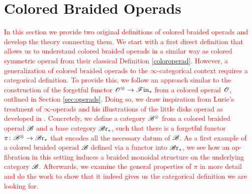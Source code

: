 \section{Colored Braided Operads}\label{sec:colbraidop}

\textcolor{red}{In this section we provide two original definitions of colored braided operads and develop the theory connecting them.
We start with a first direct definition that allows us to understand colored braided operads in a similar way as colored 
symmetric operad from their classical Definition \ref{coloroperad}.
However, a generalization of colored braided operads to the $\infty$-categorical context requires a categorical definition.
To provide this, we follow an approach similar to the construction of the forgetful functor $\mathscr{O}^{\otimes} \to \mathscr{F} \text{in}_{\ast}$ from a colored operad $\mathscr{O}$, outlined in Section \ref{sec:operads}.
Doing so, we draw inspiration from Lurie's treatment of $\infty$-operads and his illustrations of the little disks operad as developed in \cite[Section 2]{ha}.
Concretely, we define a category $\mathscr{B}^{\otimes}$ from a colored braided operad $\mathscr{B}$ and a base category $\mathscr{B} \text{r}_{\ast}$, such that there is a forgetful functor $\pi \colon \mathscr{B}^{\otimes} \to \mathscr{B} \text{r}_{\ast}$ that encodes all the necessary datum of $\mathscr{B}$.
As a first example of a colored braided operad $\mathscr{B}$ defined via a functor into $\mathscr{B} \text{r}_{\ast}$, we see how an op-fibration in this setting induces a braided monoidal structure on the underlying category $\mathscr{B}$.
Afterwards, we examine the general properties of $\pi$ in more detail and do the work to show that it indeed gives us the categorical definition we are looking for.}




